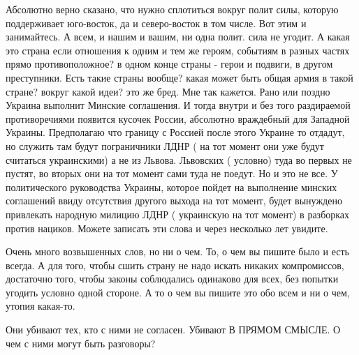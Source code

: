 \begin{itemize}
Абсолютно верно сказано, что нужно сплотиться вокруг полит силы, которую
поддерживает юго-восток, да и северо-восток в том числе. Вот этим и
занимайтесь. А всем, и нашим и вашим, ни одна полит. сила не угодит.
А какая это страна если отношения к одним и тем же героям, событиям в разных
частях прямо противоположное? в одном конце страны - герои и подвиги, в другом
преступники. Есть такие страны вообще? какая может быть общая армия в такой
стране? вокруг какой идеи? это же бред. Мне так кажется. 
Рано или поздно Украина выполнит Минские соглашения. И тогда внутри и без того
раздираемой противоречиями появится кусочек России, абсолютно враждебный для
Западной Украины. Предполагаю что границу с Россией после этого Украине то
отдадут, но служить там будут пограничники ЛДНР ( на тот момент они уже будут
считаться украинскими) а не из Львова. Львовских ( условно) туда во первых не
пустят, во вторых они на тот момент сами туда не поедут. 
Но и это не все. У политического руководства Украины, которое пойдет на
выполнение минских соглашений ввиду отсутствия другого выхода на тот момент,
будет вынуждено привлекать народную милицию ЛДНР ( украинскую на тот момент) в
разборках против нациков. Можете записать эти слова и через несколько лет
увидите.

Очень много возвышенных слов, но ни о чем. То, о чем вы пишите было и есть
всегда. А для того, чтобы сшить страну не надо искать никаких компромиссов,
достаточно того, чтобы законы соблюдались одинаково для всех, без попытки
угодить условно одной стороне.
А то о чем вы пишите это обо всем и ни о чем, утопия какая-то.

Они убивают тех, кто с ними не согласен. Убивают В ПРЯМОМ СМЫСЛЕ. О чем с ними могут быть разговоры?


\end{itemize}

